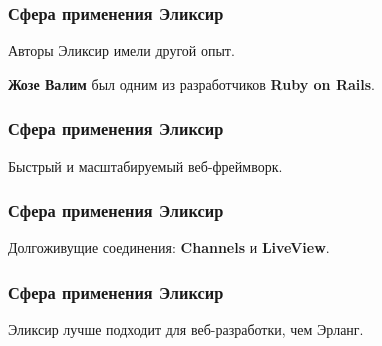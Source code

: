\documentclass[10pt,xcolor=x11names]{beamer}
\begin{document}
\begin{frame}
  \frametitle{Сфера применения Эликсир}
  Авторы Эликсир имели другой опыт.
  \par \bigskip
  \textbf{Жозе Валим} был одним из разработчиков \textbf{Ruby on Rails}.
\end{frame}

\begin{frame}
  \frametitle{Сфера применения Эликсир}
  Быстрый и масштабируемый веб-фреймворк.
\end{frame}

\begin{frame}
  \frametitle{Сфера применения Эликсир}
  Долгоживущие соединения: \textbf{Channels} и \textbf{LiveView}.
\end{frame}

\begin{frame}
  \frametitle{Сфера применения Эликсир}
  Эликсир лучше подходит для веб-разработки, чем Эрланг.
\end{frame}
\end{document}
